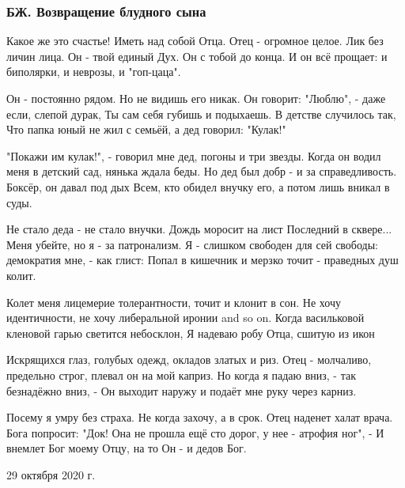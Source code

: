  
 
 

\subsubsection{БЖ. Возвращение блудного сына}
\label{sec:poetry.rus.evgenija_bilchenko.syn}


Какое же это счастье! Иметь над собой Отца.
Отец - огромное целое. Лик без личин лица.
Он - твой единый Дух. Он с тобой до конца.
И он всё прощает: и биполярки, и неврозы, и "гоп-цаца".

Он - постоянно рядом. Но не видишь его никак.
Он говорит: "Люблю", - даже если, слепой дурак,
Ты сам себя губишь и подыхаешь. В детстве случилось так,
Что папка юный не жил с семьёй, а дед говорил: "Кулак!"

"Покажи им кулак!", - говорил мне дед, погоны и три звезды.
Когда он водил меня в детский сад, нянька ждала беды.
Но дед был добр - и за справедливость. Боксёр, он давал под дых
Всем, кто обидел внучку его, а потом лишь вникал в суды.

Не стало деда - не стало внучки. Дождь моросит на лист
Последний в сквере... Меня убейте, но я - за патронализм.
Я - слишком свободен для сей свободы: демократия мне, - как глист:
Попал в кишечник и мерзко точит - праведных душ колит.

Колет меня лицемерие толерантности, точит и клонит в сон.
Не хочу идентичности, не хочу либеральной иронии and so on.
Когда васильковой кленовой гарью светится небосклон,
Я надеваю робу Отца, сшитую из икон

Искрящихся глаз, голубых одежд, окладов златых и риз.
Отец - молчаливо, предельно строг, плевал он на мой каприз.
Но когда я падаю вниз, - так безнадёжно вниз, -
Он выходит наружу и подаёт мне руку через карниз.

Посему я умру без страха. Не когда захочу, а в срок.
Отец наденет халат врача. Бога попросит: "Док!
Она не прошла ещё сто дорог, у нее - атрофия ног", -
И внемлет Бог моему Отцу, на то Он - и дедов Бог.

29 октября 2020 г.
